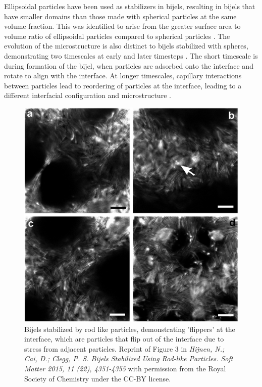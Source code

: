Ellipsoidal particles have been used as stabilizers in bijels, resulting in bijels that have smaller domains than those made with spherical particles at the same volume fraction. This was identified 
to arise from the greater surface area to volume ratio of ellipsoidal particles compared to spherical particles \cite{gunther_timescales_2014}. The evolution of the microstructure is also distinct 
to bijels stabilized with spheres, demonstrating two timescales at early and later timesteps \cite{gunther_timescales_2014}. The short timescale is during formation of the bijel, when particles 
are adsorbed onto the interface and rotate to align with the interface. At longer timescales, capillary interactions between particles lead to reordering of particles at the interface, leading 
to a different interfacial configuration and microstructure \cite{gunther_timescales_2014}. 

\begin{figure}
    \centering
    \includegraphics[scale = 0.3]{../figures/literature_review/rods_bijels.png}
    \caption{Bijels stabilized by rod like particles, demonstrating 'flippers' at the interface, which are particles that flip out of the interface due to stress from adjacent particles. 
             Reprint of Figure 3 in 
             \textit{Hijnen, N.; Cai, D.; Clegg, P. S. Bijels Stabilized Using Rod-like Particles. Soft Matter 2015, 11 (22), 4351-4355} 
             with permission from the Royal Society of Chemistry under the CC-BY license.}
    \label{fig:rod_bijel_flippers}
\end{figure}


